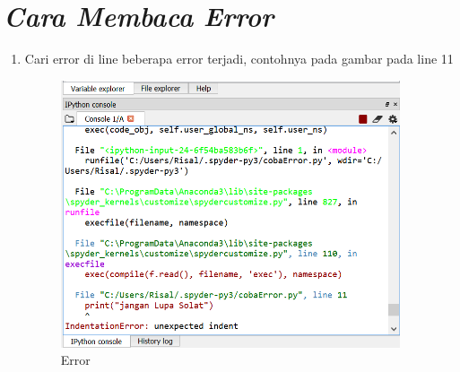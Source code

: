 \section*{\textit{Cara Membaca Error}}
\begin{enumerate}
\item Cari error di line beberapa error terjadi, contohnya pada gambar pada line 11
		\begin{figure}[h]
			\includegraphics[width=10cm]{figure/Error3.png}
			\centering
			\caption{Error}
			\end{figure}
\end{enumerate}
